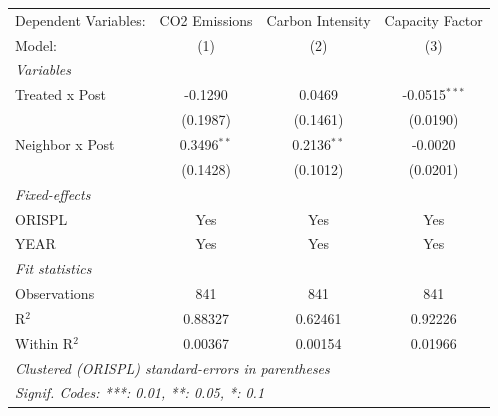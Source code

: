 
\begingroup
\centering
\begin{tabular}{lccc}
   \tabularnewline \midrule \midrule
   Dependent Variables: & CO2 Emissions & Carbon Intensity & Capacity Factor\\  
   Model:               & (1)           & (2)              & (3)\\  
   \midrule
   \emph{Variables}\\
   Treated x Post       & -0.1290       & 0.0469           & -0.0515$^{***}$\\   
                        & (0.1987)      & (0.1461)         & (0.0190)\\   
   Neighbor x Post      & 0.3496$^{**}$ & 0.2136$^{**}$    & -0.0020\\   
                        & (0.1428)      & (0.1012)         & (0.0201)\\   
   \midrule
   \emph{Fixed-effects}\\
   ORISPL               & Yes           & Yes              & Yes\\  
   YEAR                 & Yes           & Yes              & Yes\\  
   \midrule
   \emph{Fit statistics}\\
   Observations         & 841           & 841              & 841\\  
   R$^2$                & 0.88327       & 0.62461          & 0.92226\\  
   Within R$^2$         & 0.00367       & 0.00154          & 0.01966\\  
   \midrule \midrule
   \multicolumn{4}{l}{\emph{Clustered (ORISPL) standard-errors in parentheses}}\\
   \multicolumn{4}{l}{\emph{Signif. Codes: ***: 0.01, **: 0.05, *: 0.1}}\\
\end{tabular}
\par\endgroup


